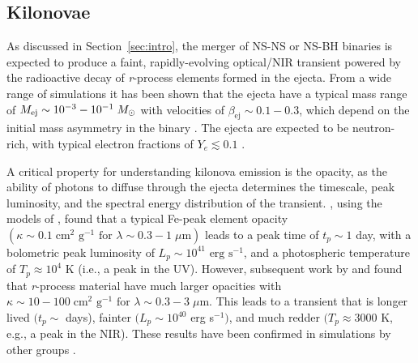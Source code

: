 \subsection{Kilonovae}
\label{sec:kilo}
As discussed in Section~\ref{sec:intro}, the merger of NS-NS or NS-BH binaries is expected to produce a faint, rapidly-evolving optical/NIR transient powered by the radioactive decay of {\em r}-process elements formed in the ejecta. From a wide range of simulations it has been shown that the ejecta have a typical mass range of $M_{\rm ej} \sim 10^{-3}-10^{-1} \; M_{\odot}$ with velocities of $\beta_{\text{ej}} \sim 0.1-0.3$, which depend on the initial mass asymmetry in the binary \citep{Rosswog+99,Rosswog05,Bauswein+13a,Rosswog+13,PiranNakar13}. The ejecta are expected to be neutron-rich, with typical electron fractions of $Y_e \lesssim 0.1$ \citep{Metzger+10}. 

A critical property for understanding kilonova emission is the opacity, as the ability of photons to diffuse through the ejecta determines the timescale, peak luminosity, and the spectral energy distribution of the transient. \citet{Metzger+10}, using the models of \citep[LP98 hereafter]{LP98}, found that a typical Fe-peak element opacity $(\kappa \sim 0.1 \; \text{cm}^2 \text{ g}^{-1} \text{ for } \lambda \sim 0.3 - 1\; \mu\text{m})$ leads to a peak time of $t_p \sim 1$ day, with a bolometric peak luminosity of $L_p \sim 10^{41} \text{ erg s}^{-1}$, and a photospheric temperature of $T_p \approx 10^4$ K (i.e., a peak in the UV). However, subsequent work by \citet{Kasen+13} and \citet{BarnesKasen13} found that {\em r}-process material have much larger opacities with $\kappa \sim 10-100 \; \text{cm}^2 \text{ g}^{-1} \text{ for } \lambda \sim 0.3 - 3\; \mu\text{m}$. This leads to a transient that is longer lived $(t_p \sim$ days), fainter $(L_p \sim 10^{40}$ erg s$^{-1})$, and much redder $(T_p \approx 3000$ K, e.g., a peak in the NIR). These results have been confirmed in simulations by other groups \citep[see e.g.,][]{TanakaHotokezaka13,Grossman+14,Tanaka+14}.

